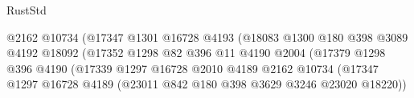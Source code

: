 \begin{lexlean}{RustStd}
\begin{coremodule}
                                                @2162
                                                @10734
                                                (@17347
                                                  @1301
                                                  @16728
                                                  @4193
                                                  (@18083
                                                    @1300
                                                    @180
                                                    @398
                                                    @3089
                                                    @4192
                                                    @18092
                                                    (@17352
                                                      @1298
                                                      @82
                                                      @396
                                                      @11
                                                      @4190
                                                      @2004
                                                      (@17379
                                                        @1298
                                                        @396
                                                        @4190
                                                        (@17339
                                                          @1297
                                                          @16728
                                                          @2010
                                                          @4189
                                                          @2162
                                                          @10734
                                                          (@17347
                                                            @1297
                                                            @16728
                                                            @4189
                                                            (@23011
                                                              @842
                                                              @180
                                                              @398
                                                              @3629
                                                              @3246
                                                              @23020
                                                              @18220))

\end{coremodule}
\end{lexlean}
